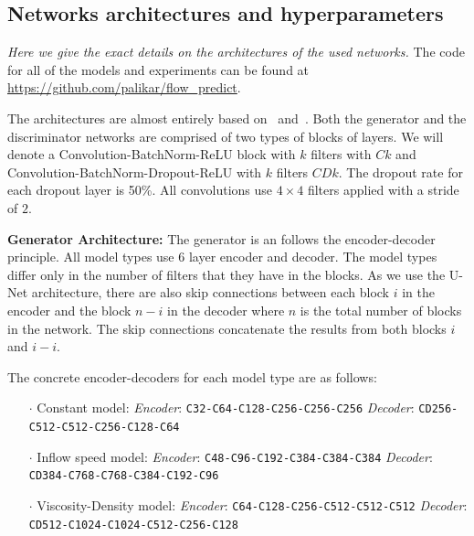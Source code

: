 \documentclass{llncs}
\begin{document}
\begin{subappendices}
\renewcommand{\thesection}{\Alph{section}}%

\section{Networks architectures and hyperparameters}\label{app1}
\emph{Here we give the exact details on the architectures of the used networks.} The code for all of the models and experiments can be found at \url{https://github.com/palikar/flow_predict}.

The architectures are almost entirely based on~\cite{pix2pix} and~\cite{radford2015}. Both the generator and the discriminator networks are comprised of two types of blocks of layers. We will denote a Convolution-BatchNorm-ReLU block with $k$ filters with $Ck$ and Convolution-BatchNorm-Dropout-ReLU with $k$ filters $CDk$. The dropout rate for each dropout layer is 50\%. All convolutions use $4\times4$ filters applied with a stride of $2$.

\noindent\textbf{Generator Architecture:}
The generator is an follows the encoder-decoder principle. All model types use 6 layer encoder and decoder. The model types differ only in the number of filters that they have in the blocks. As we use the U-Net architecture, there are also skip connections between each block $i$ in the encoder and the block $n-i$ in the decoder where $n$ is the total number of blocks in the network. The skip connections concatenate the results from both blocks $i$ and $i-i$.

The concrete encoder-decoders for each model type are as follows:
\begin{itemize}
\item[$\cdot$] Constant model:\newline
  \emph{Encoder}: \texttt{C32-C64-C128-C256-C256-C256}\newline
  \emph{Decoder}: \texttt{CD256-C512-C512-C256-C128-C64}
\item[$\cdot$] Inflow speed model:\newline
  \emph{Encoder}: \texttt{C48-C96-C192-C384-C384-C384}\newline
  \emph{Decoder}: \texttt{CD384-C768-C768-C384-C192-C96}
\item[$\cdot$] Viscosity-Density model:\newline
  \emph{Encoder}: \texttt{C64-C128-C256-C512-C512-C512} \newline
  \emph{Decoder}: \texttt{CD512-C1024-C1024-C512-C256-C128}
\end{itemize}


\end{subappendices}
\end{document}
